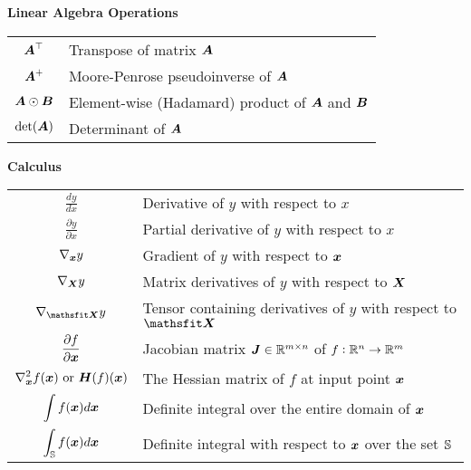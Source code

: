 \vspace{\notationgap}
\begin{minipage}{\textwidth}
	\centerline{\bf Linear Algebra Operations}
	\bgroup
	\def\arraystretch{1.5}
	\begin{tabular}{cp{3.25in}}
		$\displaystyle {\bm{A}} ^\top$ & Transpose of matrix ${\bm{A}}$ \\
		$\displaystyle {\bm{A}}^+$ & Moore-Penrose pseudoinverse of ${\bm{A}}$\\
		$\displaystyle {\bm{A}} \odot {\bm{B}} $ & Element-wise (Hadamard) product of ${\bm{A}}$ and ${\bm{B}}$ \\
		$\displaystyle \mathrm{det}({\bm{A}})$ & Determinant of ${\bm{A}}$ \\
	\end{tabular}
	\egroup
\end{minipage}

\vspace{\notationgap}
\begin{minipage}{\textwidth}
	\centerline{\bf Calculus}
	\bgroup
	\def\arraystretch{1.5}
	\begin{tabular}{cp{3.25in}}
		$\displaystyle\frac{d y} {d x}$ & Derivative of $y$ with respect to $x$\\ [2ex]
		$\displaystyle \frac{\partial y} {\partial x} $ & Partial derivative of $y$ with respect to $x$ \\
		$\displaystyle \nabla_{\bm{x}} y $ & Gradient of $y$ with respect to ${\bm{x}}$ \\
		$\displaystyle \nabla_{\bm{X}} y $ & Matrix derivatives of $y$ with respect to ${\bm{X}}$ \\
		$\displaystyle \nabla_\tX y $ & Tensor containing derivatives of $y$ with respect to $\tX$ \\
		$\displaystyle \frac{\partial f}{\partial {\bm{x}}} $ & Jacobian matrix ${\bm{J}} \in \mathbb{R}^{m\times n}$ of $f: \mathbb{R}^n \rightarrow \mathbb{R}^m$\\
		$\displaystyle \nabla_{\bm{x}}^2 f({\bm{x}})\text{ or }{\bm{H}}( f)({\bm{x}})$ & The Hessian matrix of $f$ at input point ${\bm{x}}$\\
		$\displaystyle \int f({\bm{x}}) d{\bm{x}} $ & Definite integral over the entire domain of ${\bm{x}}$ \\
		$\displaystyle \int_{\mathbb{S}} f({\bm{x}}) d{\bm{x}}$ & Definite integral with respect to ${\bm{x}}$ over the set ${\mathbb{S}}$ \\
	\end{tabular}
	\egroup
\end{minipage}

